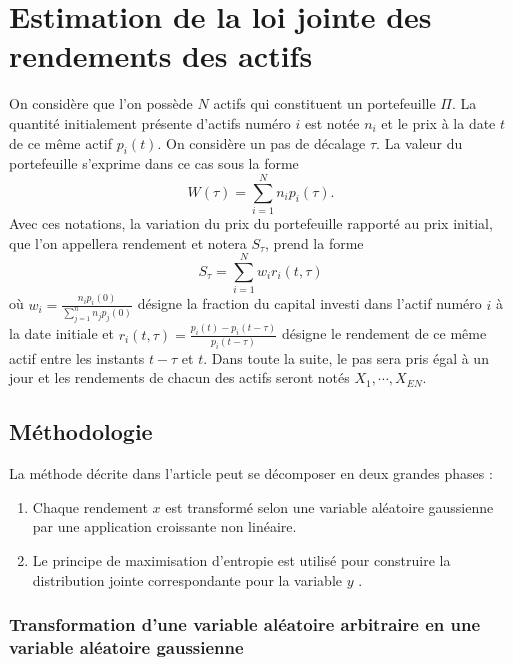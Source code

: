 \documentclass{article}
\begin{document}
\section{Estimation de la loi jointe des rendements des actifs}

On considère que l'on possède $N$ actifs qui constituent un portefeuille $\Pi$. La quantité initialement présente d'actifs numéro $i$ est notée $n_{i}$ et le prix à la date $t$de ce même actif $p_{i}(t)$.  On considère un pas de décalage $\tau$. La valeur du portefeuille s'exprime dans ce cas sous la forme
\begin{equation}
W (\tau )=\sum_{i= 1}^{N}n_{i}p_{i} (\tau ).
\end{equation}
Avec ces notations, la variation du prix du portefeuille rapporté au prix initial, que l'on appellera rendement et notera $ S_{\tau} $, prend la forme
\begin{equation}
S_{\tau}=\sum_{i= 1}^{N}w_{i}r_{i} (t,\tau )
\end{equation}
où $ w_{i}=\frac{n_{i}p_{i}(0)}{\sum_{j=1}^{n}n_{j}p_{j}(0)} $ désigne la fraction du capital investi dans l'actif numéro $ i $ à la date initiale et $ r_{i}(t,\tau )=\frac{p_{i}(t)-p_{i}(t-\tau )}{p_{i}(t-\tau )} $ désigne le rendement de ce même actif entre les instants $t-\tau$ et $t$.
Dans toute la suite, le pas sera pris égal à un jour et les rendements de chacun des actifs seront notés $ X_{ 1},\cdots , X_{EN} $.

\subsection{Méthodologie}

 La méthode décrite dans l'article peut se décomposer en deux grandes phases :
 \begin{enumerate}
 \item Chaque rendement $ x $ est transformé selon une variable aléatoire gaussienne par une application croissante non linéaire.
 \item  Le principe de  maximisation d'entropie est utilisé pour construire la distribution jointe correspondante pour la variable $ y $ . 
 \end{enumerate}
 
 \subsubsection{Transformation d'une variable aléatoire arbitraire en une variable aléatoire gaussienne}
 
\end{document}
